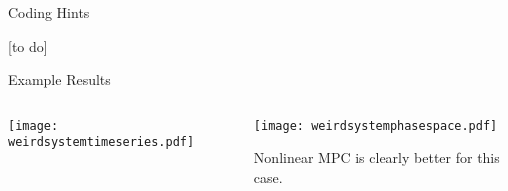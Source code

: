 \documentclass[xcolor=dvipsnames]{beamer}
\begin{document}
\begin{frame}{Coding Hints}
    
    [to do]
    
\end{frame}

\begin{frame}{Example Results}
    \begin{columns}
        \begin{column}{.475\textwidth}
            \centering
            \texttt{[image: weirdsystemtimeseries.pdf]}
        \end{column}
        \begin{column}{.475\textwidth}
            \begin{center}
                \texttt{[image: weirdsystemphasespace.pdf]}
            \end{center}
            Nonlinear MPC is clearly better for this case.
        \end{column}
    \end{columns}
    
\end{frame}
\end{document}
